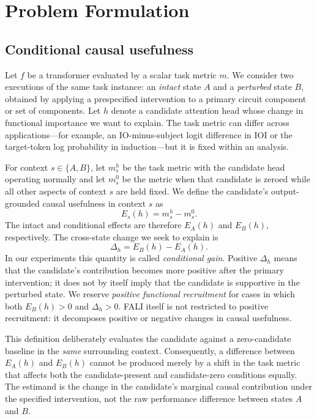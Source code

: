 \documentclass[pdflatex,sn-mathphys-ay]{sn-jnl}
\begin{document}
\section{Problem Formulation}\label{sec:problem}

\subsection{Conditional causal usefulness}\label{sec:conditional-usefulness}

Let $f$ be a transformer evaluated by a scalar task metric $m$. We consider two executions of the same task instance: an \emph{intact} state $A$ and a \emph{perturbed} state $B$, obtained by applying a prespecified intervention to a primary circuit component or set of components. Let $h$ denote a candidate attention head whose change in functional importance we want to explain. The task metric can differ across applications---for example, an IO-minus-subject logit difference in IOI or the target-token log probability in induction---but it is fixed within an analysis.

For context $s\in\{A,B\}$, let $m_s^{h}$ be the task metric with the candidate head operating normally and let $m_s^{0}$ be the metric when that candidate is zeroed while all other aspects of context $s$ are held fixed. We define the candidate's output-grounded causal usefulness in context $s$ as
\begin{equation}
E_s(h) = m_s^{h}-m_s^{0}.
\label{eq:context-effect}
\end{equation}
The intact and conditional effects are therefore $E_A(h)$ and $E_B(h)$, respectively. The cross-state change we seek to explain is
\begin{equation}
\Delta_h = E_B(h)-E_A(h).
\label{eq:conditional-gain}
\end{equation}
In our experiments this quantity is called \emph{conditional gain}. Positive $\Delta_h$ means that the candidate's contribution becomes more positive after the primary intervention; it does not by itself imply that the candidate is supportive in the perturbed state. We reserve \emph{positive functional recruitment} for cases in which both $E_B(h)>0$ and $\Delta_h>0$. FALI itself is not restricted to positive recruitment: it decomposes positive or negative changes in causal usefulness.

This definition deliberately evaluates the candidate against a zero-candidate baseline in the \emph{same} surrounding context. Consequently, a difference between $E_A(h)$ and $E_B(h)$ cannot be produced merely by a shift in the task metric that affects both the candidate-present and candidate-zero conditions equally. The estimand is the change in the candidate's marginal causal contribution under the specified intervention, not the raw performance difference between states $A$ and $B$.
\end{document}
